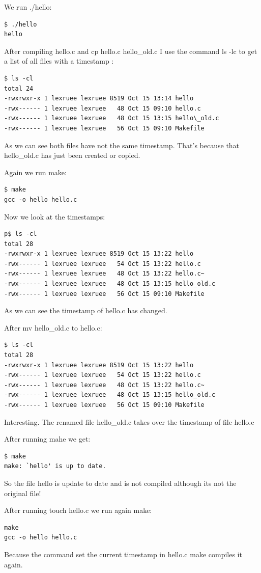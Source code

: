 \documentclass[12pt]{article}
\begin{document}
We run ./hello:
\begin{lstlisting}
$ ./hello
hello
\end{lstlisting}

After compiling hello.c and cp hello.c hello\_old.c I use the command ls -lc to get a list of all files with a timestamp :

\begin{lstlisting}
$ ls -cl
total 24
-rwxrwxr-x 1 lexruee lexruee 8519 Oct 15 13:14 hello
-rwx------ 1 lexruee lexruee   48 Oct 15 09:10 hello.c
-rwx------ 1 lexruee lexruee   48 Oct 15 13:15 hello\_old.c
-rwx------ 1 lexruee lexruee   56 Oct 15 09:10 Makefile
\end{lstlisting}
As we can see both files have not the same timestamp. That's because that hello\_old.c has just been created or copied.

Again we run make:
\begin{lstlisting}
$ make
gcc -o hello hello.c
\end{lstlisting}

Now we look at the timestamps:

\begin{lstlisting}
p$ ls -cl
total 28
-rwxrwxr-x 1 lexruee lexruee 8519 Oct 15 13:22 hello
-rwx------ 1 lexruee lexruee   54 Oct 15 13:22 hello.c
-rwx------ 1 lexruee lexruee   48 Oct 15 13:22 hello.c~
-rwx------ 1 lexruee lexruee   48 Oct 15 13:15 hello_old.c
-rwx------ 1 lexruee lexruee   56 Oct 15 09:10 Makefile
\end{lstlisting}
As we can see the timestamp of hello.c has changed.

After mv hello\_old.c to hello.c:
\begin{lstlisting}
$ ls -cl
total 28
-rwxrwxr-x 1 lexruee lexruee 8519 Oct 15 13:22 hello
-rwx------ 1 lexruee lexruee   54 Oct 15 13:22 hello.c
-rwx------ 1 lexruee lexruee   48 Oct 15 13:22 hello.c~
-rwx------ 1 lexruee lexruee   48 Oct 15 13:15 hello_old.c
-rwx------ 1 lexruee lexruee   56 Oct 15 09:10 Makefile
\end{lstlisting}
Interesting. The renamed file hello\_old.c takes over the timestamp of file hello.c

After running mahe we get:
\begin{lstlisting}
$ make
make: `hello' is up to date.
\end{lstlisting}
So the file hello is update to date and is not compiled although its not the original file!

After running touch hello.c we run again make:
\begin{lstlisting}
make
gcc -o hello hello.c
\end{lstlisting}
Because the command set the current timestamp in hello.c make compiles it again.
\end{document}
